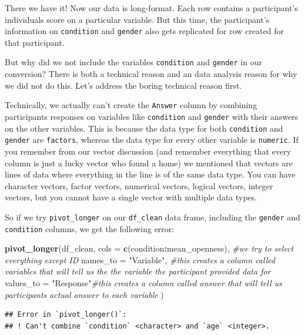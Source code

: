 \documentclass[
]{book}
\newenvironment{Shaded}{\begin{snugshade}}{\end{snugshade}}
\newcommand{\AttributeTok}[1]{\textcolor[rgb]{0.13,0.29,0.53}{#1}}
\newcommand{\CommentTok}[1]{\textcolor[rgb]{0.56,0.35,0.01}{\textit{#1}}}
\newcommand{\FunctionTok}[1]{\textcolor[rgb]{0.13,0.29,0.53}{\textbf{#1}}}
\newcommand{\NormalTok}[1]{#1}
\newcommand{\SpecialCharTok}[1]{\textcolor[rgb]{0.81,0.36,0.00}{\textbf{#1}}}
\newcommand{\StringTok}[1]{\textcolor[rgb]{0.31,0.60,0.02}{#1}}
\begin{document}
There we have it! Now our data is long-format. Each row contains a participant's individuals score on a particular variable. But this time, the participant's information on \texttt{condition} and \texttt{gender} also gets replicated for row created for that participant.

But why did we not include the variables \texttt{condition} and \texttt{gender} in our conversion? There is both a technical reason and an data analysis reason for why we did not do this. Let's address the boring technical reason first.

Technically, we actually can't create the \texttt{Answer} column by combining participants responses on variables like \texttt{condition} and \texttt{gender} with their answers on the other variables. This is because the data type for both \texttt{condition} and \texttt{gender} are \texttt{factors}, whereas the data type for every other variable is \texttt{numeric}. If you remember from our vector discussion (and remember everything that every column is just a lucky vector who found a home) we mentioned that vectors are lines of data where everything in the line is of the same data type. You can have character vectors, factor vectors, numerical vectors, logical vectors, integer vectors, but you cannot have a single vector with multiple data types.

So if we try \texttt{pivot\_longer} on our \texttt{df\_clean} data frame, including the \texttt{gender} and \texttt{condition} columns, we get the following error:

\begin{Shaded}
\begin{Highlighting}[]
\FunctionTok{pivot\_longer}\NormalTok{(df\_clean,}
  \AttributeTok{cols =} \FunctionTok{c}\NormalTok{(condition}\SpecialCharTok{:}\NormalTok{mean\_openness), }\CommentTok{\#we try to select everything except ID}
  \AttributeTok{names\_to =} \StringTok{"Variable"}\NormalTok{, }\CommentTok{\#this creates a column called \textasciigrave{}variables\textasciigrave{} that will tell us the the variable the participant provided data for}
  \AttributeTok{values\_to =} \StringTok{"Response"}\CommentTok{\#this creates a column called \textasciigrave{}answer\textasciigrave{} that will tell us participants actual answer to each variable}
\NormalTok{)}
\end{Highlighting}
\end{Shaded}

\begin{verbatim}
## Error in `pivot_longer()`:
## ! Can't combine `condition` <character> and `age` <integer>.
\end{verbatim}
\end{document}
